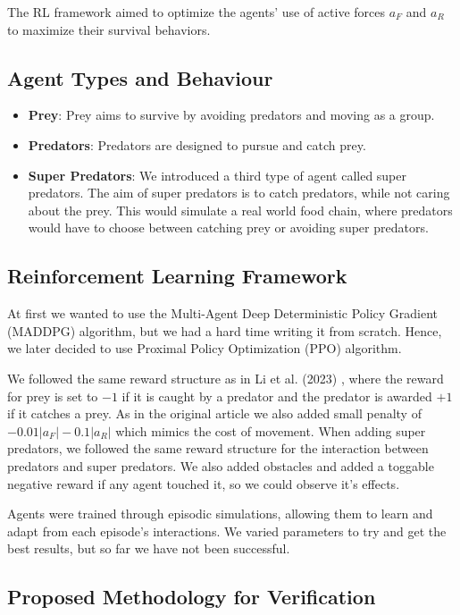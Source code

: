 \documentclass[9pt]{pnas-new}
\begin{document}
The RL framework aimed to optimize the agents' use of active forces \( a_F \) and \( a_R \) to maximize their survival behaviors.

\subsection{Agent Types and Behaviour}
\begin{itemize}
    \item \textbf{Prey}: Prey aims to survive by avoiding predators and moving as a group.
    \item \textbf{Predators}: Predators are designed to pursue and catch prey.
    \item \textbf{Super Predators}: We introduced a third type of agent called super predators. The aim of super predators is to catch predators, while not caring about the prey. This would simulate a real world food chain, where predators would have to choose between catching prey or avoiding super predators.
\end{itemize}

\subsection{Reinforcement Learning Framework} At first we wanted to use the Multi-Agent Deep Deterministic Policy Gradient (MADDPG) algorithm, but we had a hard time writing it from scratch. Hence, we later decided to use Proximal Policy Optimization (PPO) algorithm.

We followed the same reward structure as in Li et al. (2023) \cite{li2023predator}, where the reward for prey is set to $-1$ if it is caught by a predator and the predator is awarded $+1$ if it catches a prey. As in the original article we also added small penalty of $-0.01|a_F|-0.1|a_R|$ which mimics the cost of movement.
When adding super predators, we followed the same reward structure for the interaction between predators and super predators.
We also added obstacles and added a toggable negative reward if any agent touched it, so we could observe it's effects.

Agents were trained through episodic simulations, allowing them to learn and adapt from each episode's interactions. We varied parameters to try and get the best results, but so far we have not been successful.

\subsection*{Proposed Methodology for Verification}
\end{document}
